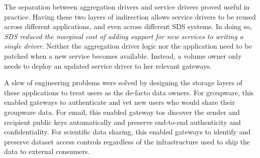 The separation between aggregation drivers and service drivers proved useful in
practice.  Having these two layers of indirection allows service
drivers to be reused across different applications, and even across different SDS systems.
In doing so, \emph{SDS reduced the marginal cost of adding support for new
services to writing a single driver}.
Neither the aggregation driver logic nor the application need to be
patched when a new service becomes available.  Instead, a volume owner only
needs to deploy an updated service driver to her relevant gateways.

A slew of engineering problems were solved by
designing the storage layers of these applications to treat users as the
de-facto data owners.
For groupware, this enabled gateways to authenticate and vet new users who would
share their groupware data.  For email, this enabled gateway tos discover the
sender and recipient public keys automatically and preserve end-to-end
authenticity and confidentiality.  For scientific data sharing,
this enabled gateways to identify and preserve dataset access controls regardless of the infrastructure used
to ship the data to external consumers.


